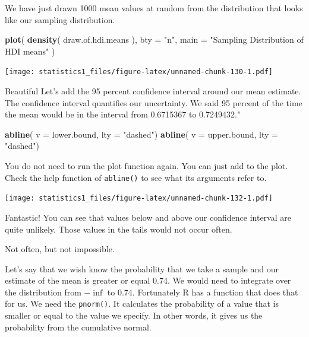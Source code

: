 \documentclass[]{book}
\newenvironment{Shaded}{\begin{snugshade}}{\end{snugshade}}
\newcommand{\KeywordTok}[1]{\textcolor[rgb]{0.13,0.29,0.53}{\textbf{#1}}}
\newcommand{\DataTypeTok}[1]{\textcolor[rgb]{0.13,0.29,0.53}{#1}}
\newcommand{\StringTok}[1]{\textcolor[rgb]{0.31,0.60,0.02}{#1}}
\newcommand{\NormalTok}[1]{#1}
\theoremstyle{definition}
\theoremstyle{definition}
\theoremstyle{definition}
\theoremstyle{remark}
\begin{document}
We have just drawn 1000 mean values at random from the distribution that
looks like our sampling distribution.

\begin{Shaded}
\begin{Highlighting}[]
\KeywordTok{plot}\NormalTok{(}
 \KeywordTok{density}\NormalTok{( draw.of.hdi.means ),}
 \DataTypeTok{bty =} \StringTok{"n"}\NormalTok{,}
 \DataTypeTok{main =} \StringTok{"Sampling Distribution of HDI means"}
\NormalTok{)}
\end{Highlighting}
\end{Shaded}

\texttt{[image: statistics1\_files/figure-latex/unnamed-chunk-130-1.pdf]}

Beautiful Let's add the 95 percent confidence interval around our mean
estimate. The confidence interval quantifies our uncertainty. We said 95
percent of the time the mean would be in the interval from 0.6715367 to
0.7249432."

\begin{Shaded}
\begin{Highlighting}[]
\KeywordTok{abline}\NormalTok{( }\DataTypeTok{v =}\NormalTok{ lower.bound, }\DataTypeTok{lty =} \StringTok{"dashed"}\NormalTok{)}
\KeywordTok{abline}\NormalTok{( }\DataTypeTok{v =}\NormalTok{ upper.bound,  }\DataTypeTok{lty =} \StringTok{"dashed"}\NormalTok{)}
\end{Highlighting}
\end{Shaded}

You do not need to run the plot function again. You can just add to the
plot. Check the help function of \texttt{abline()} to see what its
arguments refer to.

\texttt{[image: statistics1\_files/figure-latex/unnamed-chunk-132-1.pdf]}

Fantastic! You can see that values below and above our confidence
interval are quite unlikely. Those values in the tails would not occur
often.

Not often, but not impossible.

Let's say that we wish know the probability that we take a sample and
our estimate of the mean is greater or equal 0.74. We would need to
integrate over the distribution from \(-\inf\) to 0.74. Fortunately R
has a function that does that for us. We need the \texttt{pnorm()}. It
calculates the probability of a value that is smaller or equal to the
value we specify. In other words, it gives us the probability from the
cumulative normal.
\end{document}
